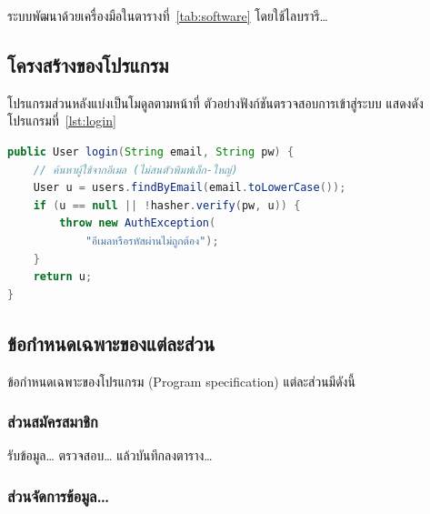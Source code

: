 ระบบพัฒนาด้วยเครื่องมือในตารางที่~\ref{tab:software} โดยใช้ไลบรารี\ldots{}

\subsection{โครงสร้างของโปรแกรม}

โปรแกรมส่วนหลังแบ่งเป็นโมดูลตามหน้าที่ ตัวอย่างฟังก์ชันตรวจสอบการเข้าสู่ระบบ
แสดงดังโปรแกรมที่~\ref{lst:login}

\begin{lstlisting}[language=Java, caption={ฟังก์ชันตรวจสอบการเข้าสู่ระบบ}, label={lst:login}]
public User login(String email, String pw) {
    // ค้นหาผู้ใช้จากอีเมล (ไม่สนตัวพิมพ์เล็ก-ใหญ่)
    User u = users.findByEmail(email.toLowerCase());
    if (u == null || !hasher.verify(pw, u)) {
        throw new AuthException(
            "อีเมลหรือรหัสผ่านไม่ถูกต้อง");
    }
    return u;
}
\end{lstlisting}

\subsection{ข้อกำหนดเฉพาะของแต่ละส่วน}

ข้อกำหนดเฉพาะของโปรแกรม (Program specification) แต่ละส่วนมีดังนี้

\subsubsection{ส่วนสมัครสมาชิก}

รับข้อมูล\ldots{} ตรวจสอบ\ldots{} แล้วบันทึกลงตาราง\ldots{}

\subsubsection{ส่วนจัดการข้อมูล\ldots{}}

